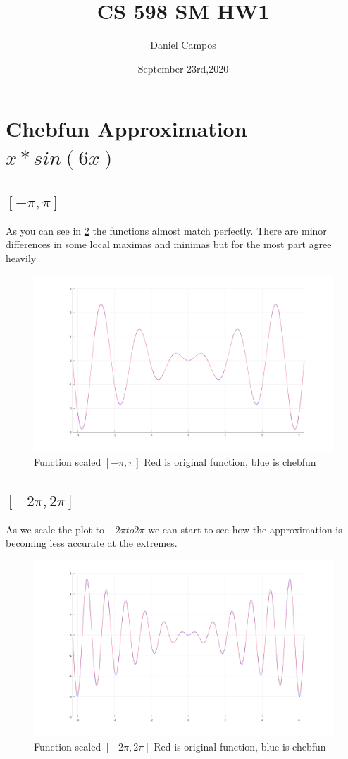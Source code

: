 \documentclass{article}
\title{CS 598 SM HW1}
\author{Daniel Campos}
\date{September 23rd,2020}
\begin{document}
\maketitle
\section{Chebfun Approximation $x * sin(6x)$}
\subsection{$[-\pi, \pi]$ }
As you can see in \ref{fig:-pi2pi} the functions almost match perfectly. There are minor differences in some local maximas and minimas but for the most part agree heavily
\begin{figure}[h!]
\centering
\includegraphics[scale=.2]{-pi2pi.png}
\caption{Function scaled $[-\pi, \pi]$ Red is original function, blue is chebfun}
\label{fig:-pi2pi}
\end{figure}
\subsection{$[-2\pi, 2\pi]$}
As we scale the plot to $-2\pi to 2\pi$ we can start to see how the approximation is becoming less accurate at the extremes. 
\begin{figure}[h!]
\centering
\includegraphics[scale=.2]{-2pi22pi.png}
\caption{Function scaled $[-2\pi, 2\pi]$ Red is original function, blue is chebfun}
\label{fig:-pi2pi}
\end{figure}
\end{document}
